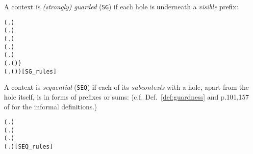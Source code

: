 A context is \emph{(strongly) guarded} (\texttt{SG}) if each hole is underneath a \emph{visible} prefix:
\begin{alltt}
 (\HOLTokenLambda{}. )
  \HOLSymConst{\HOLTokenImp{}}  (\HOLTokenLambda{}.   )
  \HOLSymConst{\HOLTokenImp{}}  (\HOLTokenLambda{}.  )
  \HOLSymConst{\HOLTokenConj{}}   \HOLSymConst{\HOLTokenImp{}}  (\HOLTokenLambda{}.   \HOLSymConst{\ensuremath{+}}  )
  \HOLSymConst{\HOLTokenConj{}}   \HOLSymConst{\HOLTokenImp{}}  (\HOLTokenLambda{}.   \HOLSymConst{\ensuremath{\parallel}}  )
  \HOLSymConst{\HOLTokenImp{}}  (\HOLTokenLambda{}. \HOLSymConst{\ensuremath{\nu}}  ( ))
  \HOLSymConst{\HOLTokenImp{}}  (\HOLTokenLambda{}.  ( ) )\hfill{[SG_rules]}
\end{alltt}

A context is \emph{sequential} (\texttt{SEQ}) if each of its \emph{subcontexts} with
a hole, apart from the hole itself, is in forms of prefixes or sums:
(c.f. Def.~\ref{def:guardness} and p.101,157 of \cite{Mil89} for
the informal definitions.)
 \begin{alltt}
 (\HOLTokenLambda{}. )
 (\HOLTokenLambda{}. )
  \HOLSymConst{\HOLTokenImp{}}  (\HOLTokenLambda{}.  )
  \HOLSymConst{\HOLTokenConj{}}   \HOLSymConst{\HOLTokenImp{}}  (\HOLTokenLambda{}.   \HOLSymConst{\ensuremath{+}}  )\hfill{[SEQ_rules]}
\end{alltt}

